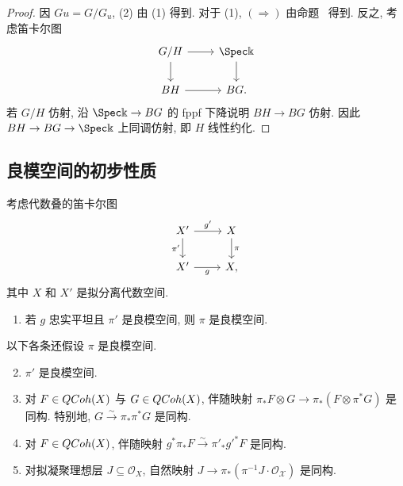 \begin{proof}
因 $Gu=G/G_u$, (2) 由 (1) 得到. 对于 (1), $(\Rightarrow)$ 由命题~ 得到. 反之, 考虑笛卡尔图
\begin{align*}
\begin{tikzcd}[ampersand replacement=\&]
G/H\arrow[r]\arrow[d]\&\Spec\Bbbk\arrow[d]\\
BH\arrow[r]\&BG.
\end{tikzcd}
\end{align*}
若 $G/H$ 仿射, 沿 $\Spec\Bbbk\to BG$ 的 fppf 下降说明 $BH\to BG$ 仿射. 因此 $BH\to BG\to\Spec\Bbbk$ 上同调仿射, 即 $H$ 线性约化.
\end{proof}

\subsection{良模空间的初步性质}\label{src:7.5.4-subsection}
\begin{lemma}\label{src:7.5.24}
考虑代数叠的笛卡尔图
\begin{align*}
\begin{tikzcd}[ampersand replacement=\&]
\mathcal X'\arrow[r,"{g'}"]\arrow[d,"{\pi'}"']\&\mathcal X\arrow[d,"{\pi}"]\\
X'\arrow[r,"{g}"']\&X,
\end{tikzcd}
\end{align*}
其中 $X$ 和 $X'$ 是拟分离代数空间.
\begin{enumerate}[(1)]
\item 若 $g$ 忠实平坦且 $\pi'$ 是良模空间, 则 $\pi$ 是良模空间.
\end{enumerate}
以下各条还假设 $\pi$ 是良模空间.
\begin{enumerate}[(1)]\setcounter{enumi}{1}
\item $\pi'$ 是良模空间.
\item 对 $F\in QCoh(X)$ 与 $G\in QCoh(X)$, 伴随映射 $\pi_*F\otimes G\to\pi_*(F\otimes\pi^*G)$ 是同构. 特别地, $G\xrightarrow{\sim}\pi_*\pi^*G$ 是同构.
\item 对 $F\in QCoh(X)$, 伴随映射 $g^*\pi_*F\xrightarrow{\sim}\pi'_*g'^*F$ 是同构.
\item 对拟凝聚理想层 $J\subseteq\mathcal O_X$, 自然映射 $J\to\pi_*(\pi^{-1}J\cdot\mathcal O_{\mathcal X})$ 是同构.
\end{enumerate}
\end{lemma}
